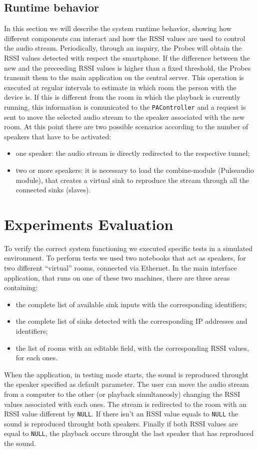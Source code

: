 \documentclass[conference]{IEEEtran}
\begin{document}
\subsection{Runtime behavior}
In this section we will describe the system runtime behavior, showing how different components can interact and how the RSSI values are used to control the audio stream.
Periodically, through an inquiry, the Probes will obtain the RSSI values detected with respect the smartphone. If the difference between the new and the preceeding RSSI values is higher than a fixed threshold, the Probes transmit them to the main application on the central server. This operation is executed at regular intervals to estimate in which room the person with the device is. If this is different from the room in which the playback is currently running, this information is comunicated to the \texttt{PAController} and a request is sent to move the selected audio stream to the speaker associated with the new room. At this point there are two possible scenarios according to the number of speakers that have to be activated:
\begin{itemize}
\item one speaker: the audio stream is directly redirected to the respective tunnel;
\item two or more speakers: it is necessary to load the combine-module (Pulseaudio module), that creates a virtual sink to reproduce the stream through all the connected sinks (slaves).
\end{itemize}

\section{Experiments Evaluation}
To verify the correct system functioning we executed specific tests in a simulated environment. To perform tests we used two notebooks that act as speakers, for two different ``virtual'' rooms, connected via Ethernet. In the main interface application, that runs on one of these two machines, there are three areas containing:
\begin{itemize}
\item the complete list of available sink inputs with the corresponding identifiers;
\item the complete list of sinks detected with the corresponding IP addresses and identifiers;
\item the list of rooms with an editable field, with the corresponding RSSI values, for each ones.
\end{itemize}
When the application, in testing mode starts, the sound is reproduced throught the speaker specified as default parameter. The user can move the audio stream from a computer to the other (or playback simultaneosly) changing the RSSI values associated with each ones. The stream is redirected to the room with an RSSI value different by \texttt{NULL}. If there isn't an RSSI value equals to \texttt{NULL} the sound is reproduced throught both speakers. Finally if both RSSI values are equal to \texttt{NULL}, the playback occurs throught the last speaker that has reproduced the sound.
\end{document}
